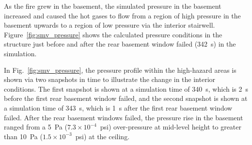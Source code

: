 \documentclass[12pt,oneside]{book}
\begin{document}
As the fire grew in the basement, the simulated pressure in the basement increased and caused the hot gases to flow from a region of high pressure in the basement upwards to a region of low pressure via the interior stairwell. Figure~\ref{fig:smv_pressure} shows the calculated pressure conditions in the structure just before and after the rear basement window failed (342~s) in the simulation.

In Fig.~\ref{fig:smv_pressure}, the pressure profile within the high-hazard areas is shown via two snapshots in time to illustrate the change in the interior conditions. The first snapshot is shown at a simulation time of 340~s, which is 2~s before the first rear basement window failed, and the second snapshot is shown at a simulation time of 343~s, which is 1~s after the first rear basement window failed. After the rear basement windows failed, the pressure rise in the basement ranged from a 5~Pa ($7.3 \times 10^{-4}$~psi) over-pressure at mid-level height to greater than 10~Pa ($1.5 \times 10^{-3}$~psi) at the ceiling.


\clearpage
\end{document}
